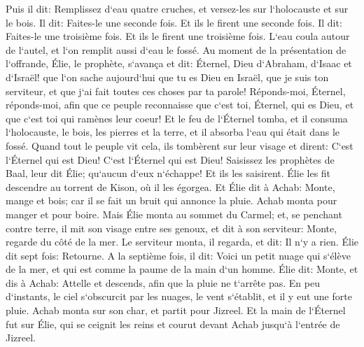 \verse Puis il dit: Remplissez d`eau quatre cruches, et versez-les sur l`holocauste et sur le bois. Il dit: Faites-le une seconde fois. Et ils le firent une seconde fois. Il dit: Faites-le une troisième fois. Et ils le firent une troisième fois. 
\verse L`eau coula autour de l`autel, et l`on remplit aussi d`eau le fossé. 
\verse Au moment de la présentation de l`offrande, Élie, le prophète, s`avança et dit: Éternel, Dieu d`Abraham, d`Isaac et d`Israël! que l`on sache aujourd`hui que tu es Dieu en Israël, que je suis ton serviteur, et que j`ai fait toutes ces choses par ta parole! 
\verse Réponds-moi, Éternel, réponds-moi, afin que ce peuple reconnaisse que c`est toi, Éternel, qui es Dieu, et que c`est toi qui ramènes leur coeur! 
\verse Et le feu de l`Éternel tomba, et il consuma l`holocauste, le bois, les pierres et la terre, et il absorba l`eau qui était dans le fossé. 
\verse Quand tout le peuple vit cela, ils tombèrent sur leur visage et dirent: C`est l`Éternel qui est Dieu! C`est l`Éternel qui est Dieu! 
\verse Saisissez les prophètes de Baal, leur dit Élie; qu`aucun d`eux n`échappe! Et ils les saisirent. Élie les fit descendre au torrent de Kison, où il les égorgea. 
\verse Et Élie dit à Achab: Monte, mange et bois; car il se fait un bruit qui annonce la pluie. 
\verse Achab monta pour manger et pour boire. Mais Élie monta au sommet du Carmel; et, se penchant contre terre, il mit son visage entre ses genoux, 
\verse et dit à son serviteur: Monte, regarde du côté de la mer. Le serviteur monta, il regarda, et dit: Il n`y a rien. Élie dit sept fois: Retourne. 
\verse A la septième fois, il dit: Voici un petit nuage qui s`élève de la mer, et qui est comme la paume de la main d`un homme. Élie dit: Monte, et dis à Achab: Attelle et descends, afin que la pluie ne t`arrête pas. 
\verse En peu d`instants, le ciel s`obscurcit par les nuages, le vent s`établit, et il y eut une forte pluie. Achab monta sur son char, et partit pour Jizreel. 
\verse Et la main de l`Éternel fut sur Élie, qui se ceignit les reins et courut devant Achab jusqu`à l`entrée de Jizreel. 

\chapter{}

